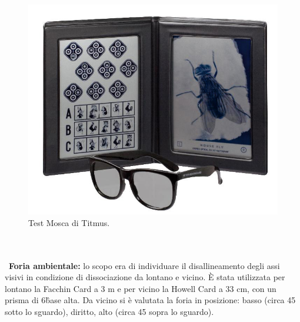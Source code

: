 \begin{figure}[h!]
	\centering
	\includegraphics[scale=0.22]{source/immagini/titmus.jpg}
	\caption[Test Mosca di Titmus]{Test Mosca di Titmus.}
	\label{fig:issuexample}
\end{figure}
\\\ \\\
\textbf{Foria ambientale:} lo scopo era di individuare il disallineamento degli assi visivi in condizione di dissociazione da
lontano e vicino. È stata utilizzata per lontano la Facchin Card a 3 m e per vicino la Howell Card a 33 cm, con un prisma di 6\^ base alta. Da vicino si è valutata la foria
in posizione: basso (circa 45\° sotto lo sguardo), diritto, alto (circa 45\° sopra lo sguardo).

